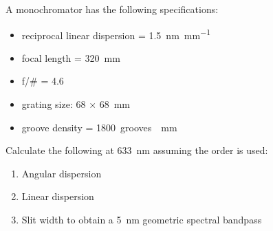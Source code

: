 \documentclass{hw}
\begin{document}
\problem{}
    A monochromator has the following specifications:
    \begin{itemize}
        \item reciprocal linear dispersion = \SI{1.5}{\nano\meter\per\milli\meter}
        \item focal length = \SI{320}{\milli\meter}
        \item f/\# = \num{4.6}
        \item grating size: \num{68} $\times$ \SI{68}{\milli\meter}
        \item groove density = \SI{1800}{grooves \per\milli\meter}
    \end{itemize}
    Calculate the following at \SI{633}{\nano\meter} assuming the  order is used:
    \begin{enumerate}
        \item Angular dispersion
        \item Linear dispersion
        \item Slit width to obtain a \SI{5}{\nano\meter} geometric spectral bandpass
    \end{enumerate}
\solution
\end{document}
